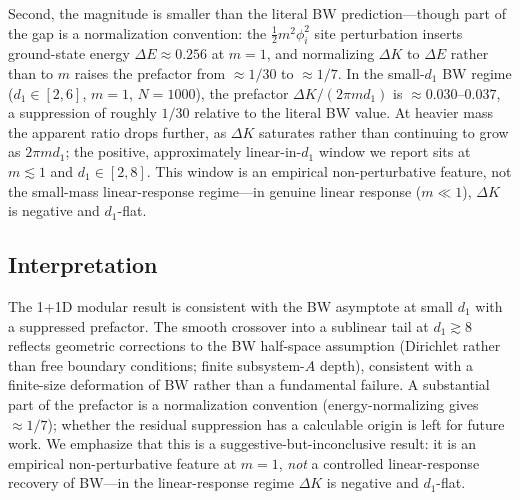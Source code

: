 \documentclass[11pt]{article}
\begin{document}
Second, the magnitude is smaller than the literal BW prediction---though part of the gap is a
normalization convention: the $\tfrac{1}{2}m^{2}\phi_{i}^{2}$ site perturbation inserts ground-state
energy $\Delta E \approx 0.256$ at $m=1$, and normalizing $\Delta K$ to $\Delta E$ rather than to $m$
raises the prefactor from $\approx 1/30$ to $\approx 1/7$. In the small-$d_{1}$ BW regime
($d_{1}\in[2,6]$, $m=1$, $N=1000$), the prefactor $\Delta K/(2\pi m d_{1})$ is $\approx 0.030$--$0.037$,
a suppression of roughly $1/30$ relative to the literal BW value. At heavier mass the apparent ratio
drops further, as $\Delta K$ saturates rather than continuing to grow as $2\pi m d_{1}$; the positive,
approximately linear-in-$d_1$ window we report sits at $m\lesssim 1$ and $d_{1}\in[2,8]$. This window
is an empirical non-perturbative feature, not the small-mass linear-response regime---in genuine
linear response ($m\ll 1$), $\Delta K$ is negative and $d_1$-flat.

\subsection{Interpretation}
The 1+1D modular result is consistent with the BW asymptote at small $d_{1}$ with a suppressed
prefactor. The smooth crossover into a sublinear tail at $d_{1}\gtrsim 8$ reflects geometric corrections
to the BW half-space assumption (Dirichlet rather than free boundary conditions; finite subsystem-$A$
depth), consistent with a finite-size deformation of BW rather than a fundamental failure. A substantial
part of the prefactor is a normalization convention (energy-normalizing gives $\approx 1/7$); whether the
residual suppression has a calculable origin is left for future work. We emphasize that this is a
suggestive-but-inconclusive result: it is an empirical non-perturbative feature at $m=1$, \emph{not} a
controlled linear-response recovery of BW---in the linear-response regime $\Delta K$ is negative and
$d_{1}$-flat.
\end{document}
